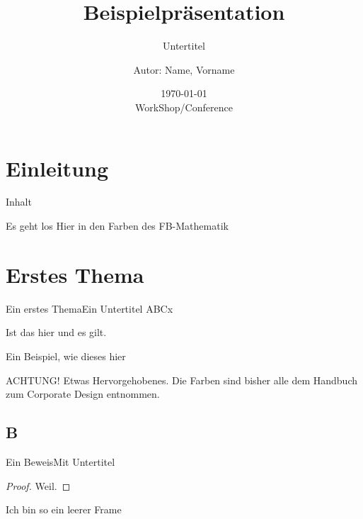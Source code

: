 \documentclass[german,10pt,xcolor=colortbl,compress
]{beamer}
\title{Beispielpräsentation}
\subtitle{Untertitel}
\date[]{\today\\[1ex] WorkShop/Conference}
\author[Autor in Fußzeile]{Autor: Name, Vorname}
\institute[]{AG xy\\FB ab\\TU Kaiserslautern}
\begin{document}
	\maketitle	
	\section{Einleitung}
	\begin{frame}{Inhalt}
		\tableofcontents
	\end{frame}
	\begin{frame}{Es geht los}
		Hier in den Farben des FB-Mathematik
	\end{frame}
	\section{Erstes Thema}
	\begin{frame}{Ein erstes Thema}{Ein Untertitel}
	ABCx
	\begin{lemma}
		Ist das hier und es gilt.
	\end{lemma}
	\begin{example}
		Ein Beispiel, wie dieses hier
	\end{example}
	\alert{ACHTUNG!}
		Etwas Hervorgehobenes. Die Farben sind bisher alle dem Handbuch zum Corporate Design entnommen.
	\end{frame}
	\subsection{B}
	\begin{frame}{Ein Beweis}{Mit Untertitel}
			\begin{proof}
				Weil.
			\end{proof}
	\end{frame}
	\begin{frame}[plain]{}{}%
		Ich bin so ein leerer Frame
	\end{frame}
\end{document}
